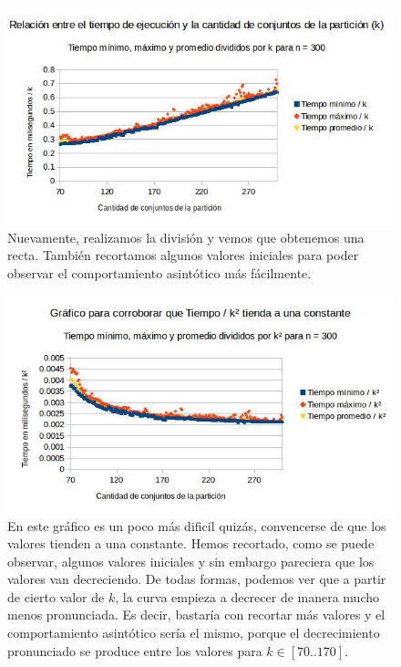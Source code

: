 \documentclass[a4paper]{article}
\begin{document}
\begin{figure}[h!]
\centering
\includegraphics[scale=0.7]{graficostiempohgolosa/tiempocompletosnfijo2.jpg}\caption{Nuevamente, realizamos la división y vemos que obtenemos una recta. También recortamos algunos valores iniciales para poder observar el comportamiento asintótico más fácilmente.}
\end{figure}

\begin{figure}[h!]
\centering
\includegraphics[scale=0.7]{graficostiempohgolosa/tiempocompletosnfijo3.jpg}\caption{En este gráfico es un poco más dificil quizás, convencerse de que los valores tienden a una constante. Hemos recortado, como se puede observar, algunos valores iniciales y sin embargo pareciera que los valores van decreciendo. De todas formas, podemos ver que a partir de cierto valor de $k$, la curva empieza a decrecer de manera mucho menos pronunciada. Es decir, bastaría con recortar más valores y el comportamiento asintótico sería el mismo, porque el decrecimiento pronunciado se produce entre los valores para $k \in [70..170]$.}
\end{figure}
\end{document}
